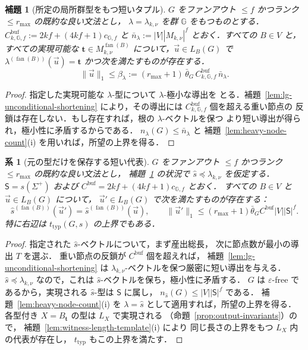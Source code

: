 \documentclass[11pt,a4paper]{ltjsarticle}
\numberwithin{equation}{section}
\theoremstyle{plain}
\newtheorem{lemma}[theorem]{補題}
\newtheorem{corollary}[theorem]{系}
\theoremstyle{definition}
\theoremstyle{remark}
\newcommand{\tuple}[1]{\vec{#1}}
\newcommand{\eps}{\varepsilon}
\newcommand{\fan}{\operatorname{fan}}
\theoremstyle{plain}
\begin{document}
\begin{lemma}[所定の局所群型をもつ短いタプル]
\label{lem:local-group-shortest}
$G$ をファンアウト $\le f$ かつランク $\le r_{\max}$ の既約な良い文法とし，
$\lambda=\lambda_{k,\nu}$ を群 ${\mathbb G}$ をもつものとする．
$C^{\mathrm{buf}}_{k,{\mathbb G},f}:=2kf+(4kf+1)c_{{\mathbb G},f}$ と
$\bar n_\lambda:=|V||M_{k,\nu}|^f$ とおく．すべての $B\in V$ と，すべての実現可能な
$\mathbf t\in M_{k,\nu}^{\fan(B)}$ について，$\tuple u\in L_B(G)$ で
$\lambda^{(\fan(B))}(\tuple u)=\mathbf t$ かつ次を満たすものが存在する．
\[
 \|\tuple u\|_1\le\beta_\lambda:=(r_{\max}+1)\,\bar\theta_G\,
 C^{\mathrm{buf}}_{k,{\mathbb G},f}\,\bar n_\lambda .
\]
\end{lemma}

\begin{proof}
指定した実現可能な $\lambda$-型について $\lambda$-極小な導出を
とる．補題~\ref{lem:lg-unconditional-shortening} により，その導出には
$C^{\mathrm{buf}}_{k,\mathbb G,f}$ 個を超える重い節点の
反鎖は存在しない．もし存在すれば，根の $\lambda$-ベクトルを保つ
より短い導出が得られ，極小性に矛盾するからである．
$n_\lambda(G)\le\bar n_\lambda$ と
補題~\ref{lem:heavy-node-count}(i) を用いれば，所望の上界を得る．
\end{proof}

\begin{corollary}[元の型だけを保存する短い代表]
\label{cor:lg-type-level-shortest}
$G$ をファンアウト $\le f$ かつランク $\le r_{\max}$ の既約な良い文法とし，
補題~\ref{lem:local-group-shortest} の状況で
$\widehat s\preceq\lambda_{k,\nu}$ を仮定する．
$\mathsf S=s(\Sigma^+)$ および
$C^{\mathrm{buf}}=2kf+(4kf+1)c_{{\mathbb G},f}$ とおく．
すべての $B\in V$ と $\tuple u\in L_B(G)$ について，
$\tuple u'\in L_B(G)$ で次を満たすものが存在する：
\[
 \widehat s^{(\fan(B))}(\tuple u')=
 \widehat s^{(\fan(B))}(\tuple u),\qquad
 \|\tuple u'\|_1\le
 (r_{\max}+1)\bar\theta_G C^{\mathrm{buf}}|V||\mathsf S|^f.
\]
特に右辺は $t_{\mathrm{typ}}(G,s)$ の上界でもある．
\end{corollary}

\begin{proof}
指定された $\widehat s$-ベクトルについて，まず産出総長，
次に節点数が最小の導出 $T$ を選ぶ．
重い節点の反鎖が $C^{\mathrm{buf}}$ 個を超えれば，
補題~\ref{lem:lg-unconditional-shortening} は
$\lambda_{k,\nu}$-ベクトルを保つ厳密に短い導出を与える．
$\widehat s\preceq\lambda_{k,\nu}$ なので，これは
$\widehat s$-ベクトルを保ち，極小性に矛盾する．
$G$ は $\eps$-free であるから，実現される
$\widehat s$-型は $\mathsf S$ に属し，
$n_{\widehat s}(G)\le|V||\mathsf S|^f$ である．
補題~\ref{lem:heavy-node-count}(i) を $\lambda=\widehat s$
として適用すれば，所望の上界を得る．
各型付き $X=B_{\mathbf t}$ の型は $L_X$ で実現される
（命題~\ref{prop:output-invariants}）ので，
補題~\ref{lem:witness-length-template}(i) により
同じ長さの上界をもつ $L_X$ 内の代表が存在し，
$t_{\mathrm{typ}}$ もこの上界を満たす．
\end{proof}
\end{document}
